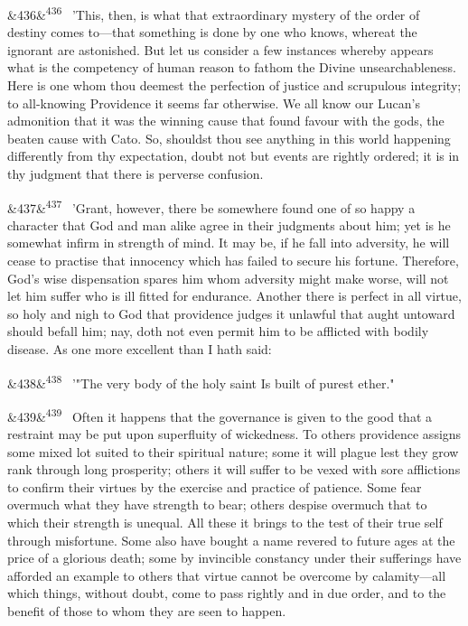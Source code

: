 \documentclass[12pt]{article}
\newcommand{\para}[1][]{\par\noindent\ifx&#1&\else\textsuperscript{\footnotesize #1}~\fi}
\begin{document}
\para[436] 'This, then, is what that extraordinary mystery of the order of destiny comes to---that something is done by one who knows, whereat the ignorant are astonished. But let us consider a few instances whereby appears what is the competency of human reason to fathom the Divine unsearchableness. Here is one whom thou deemest the perfection of justice and scrupulous integrity; to all-knowing Providence it seems far otherwise. We all know our Lucan's admonition that it was the winning cause that found favour with the gods, the beaten cause with Cato. So, shouldst thou see anything in this world happening differently from thy expectation, doubt not but events are rightly ordered; it is in thy judgment that there is perverse confusion.

\para[437] 'Grant, however, there be somewhere found one of so happy a character that God and man alike agree in their judgments about him; yet is he somewhat infirm in strength of mind. It may be, if he fall into adversity, he will cease to practise that innocency which has failed to secure his fortune. Therefore, God's wise dispensation spares him whom adversity might make worse, will not let him suffer who is ill fitted for endurance. Another there is perfect in all virtue, so holy and nigh to God that providence judges it unlawful that aught untoward should befall him; nay, doth not even permit him to be afflicted with bodily disease. As one more excellent than I hath said:

\para[438] '"The very body of the holy saint Is built of purest ether."

\para[439] Often it happens that the governance is given to the good that a restraint may be put upon superfluity of wickedness. To others providence assigns some mixed lot suited to their spiritual nature; some it will plague lest they grow rank through long prosperity; others it will suffer to be vexed with sore afflictions to confirm their virtues by the exercise and practice of patience. Some fear overmuch what they have strength to bear; others despise overmuch that to which their strength is unequal. All these it brings to the test of their true self through misfortune. Some also have bought a name revered to future ages at the price of a glorious death; some by invincible constancy under their sufferings have afforded an example to others that virtue cannot be overcome by calamity---all which things, without doubt, come to pass rightly and in due order, and to the benefit of those to whom they are seen to happen.
\end{document}
